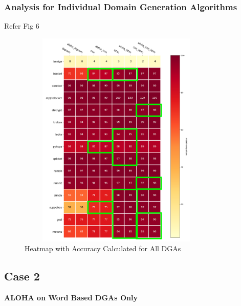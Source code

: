 \documentclass[conference]{IEEEtran}
\begin{document}
\subsubsection{Analysis for Individual Domain Generation Algorithms} 
Refer Fig 6\\
\begin{figure}[!h]
\centerline{\includegraphics[width=9.5cm,height=10.5cm,keepaspectratio]{heatmap.png}}
\caption{Heatmap with Accuracy Calculated for All DGAs  }
\label{fig}
\end{figure}

\subsection{Case 2}
\textbf{ALOHA on Word Based DGAs Only}
\end{document}
